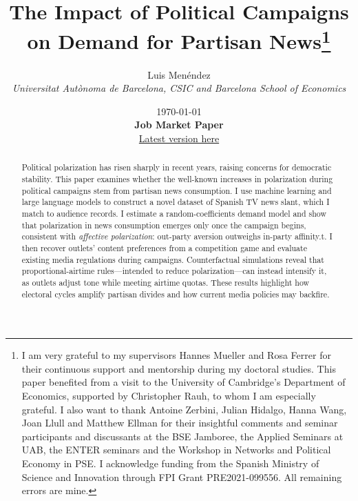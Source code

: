 \documentclass[12pt]{article}
\title{The Impact of Political Campaigns on Demand for Partisan News\thanks{I am very grateful to my supervisors Hannes Mueller and Rosa Ferrer for their continuous support and mentorship during my doctoral studies. This paper benefited from a visit to the University of Cambridge’s Department of Economics, supported by Christopher Rauh, to whom I am especially grateful. I also want to thank Antoine Zerbini, Julian Hidalgo, Hanna Wang, Joan Llull and Matthew Ellman for their insightful comments and seminar participants and discussants at the BSE Jamboree, the Applied Seminars at UAB, the ENTER seminars and the Workshop in Networks and Political Economy in PSE. I acknowledge funding from the Spanish Ministry of Science and Innovation through FPI Grant PRE2021-099556. All remaining errors are mine.}}
\author{Luis  Menéndez \\
	\textit{\small Universitat Autònoma de Barcelona, CSIC and Barcelona School of Economics}
} %
\date{%
	\today\\[2ex]
	{\bfseries Job Market Paper}\\[1ex]
	{\normalsize\href{https://www.dropbox.com/scl/fi/f3546vufz11vj5r63xml4/elections_draft.pdf?rlkey=exjw9vm3sasahlb54ohjf2tyx\&e=1\&dl=0}{Latest version here}}
}
\renewcommand\thepart{}      %
\renewcommand\partname{}      %
\begin{document}
	
\renewcommand\thepart{}      %
\renewcommand\partname{}      %
	
	
	\maketitle
	
	\begin{abstract}
		
Political polarization has risen sharply in recent years, raising concerns for democratic stability. This paper examines whether the well-known increases in polarization during political campaigns stem from partisan news consumption. I use machine learning and large language models to construct a novel dataset of Spanish TV news slant, which I match to audience records. I estimate a random-coefficients demand model and show that polarization in news consumption emerges only once the campaign begins, consistent with \textit{affective polarization}: out-party aversion outweighs in-party affinity.t. I then recover outlets’ content preferences from a competition game and evaluate existing media regulations during campaigns. Counterfactual simulations reveal that proportional-airtime rules—intended to reduce polarization—can instead intensify it, as outlets adjust tone while meeting airtime quotas. These results highlight how electoral cycles amplify partisan divides and how current media policies may backfire.
	
		
		
	\end{abstract}
	
\end{document}
